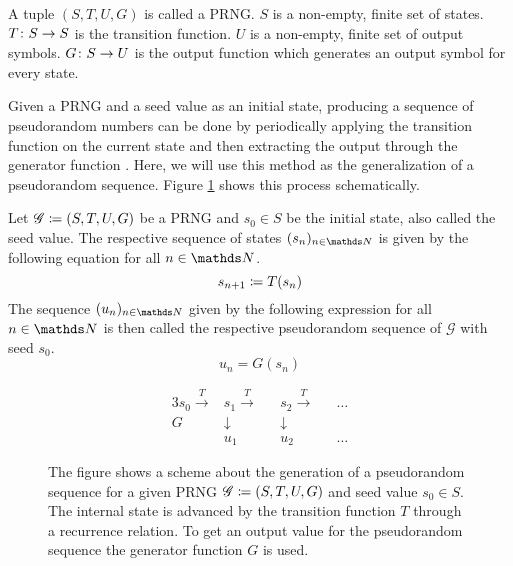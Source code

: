 \documentclass{stdlocal}
\begin{document}
    \begin{definition}
      A tuple $(S,T,U,G)$ is called a PRNG.
      $S$ is a non-empty, finite set of states.
      $T\colon S\to S$ is the transition function.
      $U$ is a non-empty, finite set of output symbols.
      $G\colon S\to U$ is the output function which generates an output symbol for every state.
    \end{definition}

    Given a PRNG and a seed value as an initial state, producing a sequence of pseudorandom numbers can be done by periodically applying the transition function on the current state and then extracting the output through the generator function \autocite{barash2017,lecuyer1994,lecuyer2015}.
    Here, we will use this method as the generalization of a pseudorandom sequence.
    Figure \ref{fig:scheme-pseudorandom-sequence} shows this process schematically.

    \begin{definition}
      Let $\mathscr{G}\coloneqq (S,T,U,G)$ be a PRNG and $s_0\in S$ be the initial state, also called the seed value.
      The respective sequence of states $(s_n)_{n\in\setNatural}$ is given by the following equation for all $n\in\setNatural$.
      \[
        s_{n+1} \coloneqq T(s_n)
      \]
      The sequence $(u_n)_{n\in\setNatural}$ given by the following expression for all $n\in\setNatural$ is then called the respective pseudorandom sequence of $\mathscr{G}$ with seed $s_0$.
      \[
        u_n = G(s_n)
      \]
    \end{definition}

    \begin{figure}
      \center
      \begin{minipage}[b]{0.5\textwidth}
      \begin{alignat*}{3}
        s_0 \xrightarrow{T} &s_1 \xrightarrow{T} &&s_2 \xrightarrow{T} &&\ldots \\
        G &\downarrow &&\downarrow \\
        &u_1 &&u_2 &&\ldots
      \end{alignat*}
      \end{minipage}
      \caption[Generation of a Pseudorandom Sequence]{%
        The figure shows a scheme about the generation of a pseudorandom sequence for a given PRNG $\mathscr{G}\coloneqq (S,T,U,G)$ and seed value $s_0\in S$.
        The internal state is advanced by the transition function $T$ through a recurrence relation.
        To get an output value for the pseudorandom sequence the generator function $G$ is used.
      }
      \label{fig:scheme-pseudorandom-sequence}
    \end{figure}
\end{document}
